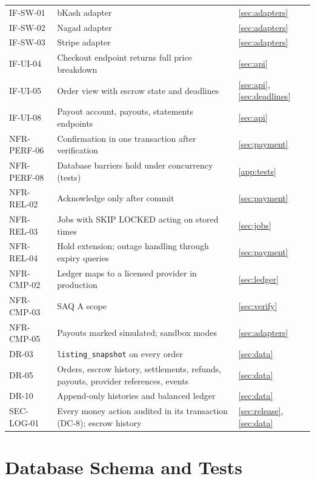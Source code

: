 \documentclass[11pt,a4paper]{article}
\begin{document}
{\begin{longtable}{@{}>{\ttfamily}p{2.4cm}>{\raggedright\arraybackslash}p{10.6cm}>{\raggedright\arraybackslash}p{2.2cm}@{}}
IF-SW-01 & bKash adapter & \ref{sec:adapters} \\
IF-SW-02 & Nagad adapter & \ref{sec:adapters} \\
IF-SW-03 & Stripe adapter & \ref{sec:adapters} \\
IF-UI-04 & Checkout endpoint returns full price breakdown & \ref{sec:api} \\
IF-UI-05 & Order view with escrow state and deadlines & \ref{sec:api}, \ref{sec:deadlines} \\
IF-UI-08 & Payout account, payouts, statements endpoints & \ref{sec:api} \\
NFR-PERF-06 & Confirmation in one transaction after verification & \ref{sec:payment} \\
NFR-PERF-08 & Database barriers hold under concurrency (tests) & \ref{app:tests} \\
NFR-REL-02 & Acknowledge only after commit & \ref{sec:payment} \\
NFR-REL-03 & Jobs with SKIP LOCKED acting on stored times & \ref{sec:jobs} \\
NFR-REL-04 & Hold extension; outage handling through expiry queries & \ref{sec:payment} \\
NFR-CMP-02 & Ledger maps to a licensed provider in production & \ref{sec:ledger} \\
NFR-CMP-03 & SAQ A scope & \ref{sec:verify} \\
NFR-CMP-05 & Payouts marked simulated; sandbox modes & \ref{sec:adapters} \\
DR-03 & \texttt{listing\_snapshot} on every order & \ref{sec:data} \\
DR-05 & Orders, escrow history, settlements, refunds, payouts, provider references, events & \ref{sec:data} \\
DR-10 & Append-only histories and balanced ledger & \ref{sec:data} \\
SEC-LOG-01 & Every money action audited in its transaction (DC-8); escrow history & \ref{sec:release}, \ref{sec:data} \\
\bottomrule\end{longtable}}


\section{Database Schema and Tests}
\label{app:ddl}
\end{document}
